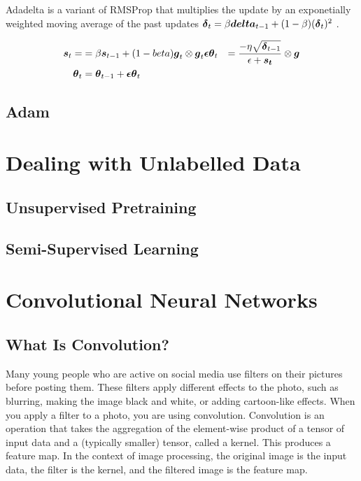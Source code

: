 \documentclass{article}
\begin{document}
Adadelta is a variant of RMSProp that multiplies the update by an exponetially weighted moving average of the past updates \(\vb*{\delta}_t = \beta \vb*{delta}_{t-1} + (1-\beta)(\vb*{\delta}_t)^2\) \cite{pml1book} \cite{zeiler2012}.

\begin{align*}
    \vb*{s}_t = &= \beta \vb*{s}_{t-1} + (1-beta)\vb*{g}_t \otimes \vb*{g}_t
    \vb*{\epsilon \theta}_t &= \frac{-\eta \sqrt{\vb*{\delta}_{t-1}}}{\epsilon + \vb*{s_t}} \otimes \vb*{g} \\
    \vb*{\theta}_t &= \vb*{\theta}_{t-1} + \vb*{\epsilon \theta}_t
\end{align*}


\subsection{Adam} %

\section{Dealing with Unlabelled Data}

\subsection{Unsupervised Pretraining}

\subsection{Semi-Supervised Learning} %

\section{Convolutional Neural Networks}


\subsection{What Is Convolution?}

Many young people who are active on social media use filters on their pictures before posting them. These filters apply different effects to the photo, such as blurring, making the image black and white, or adding cartoon-like effects. When you apply a filter to a photo, you are using convolution. Convolution is an operation that takes the aggregation of the element-wise product of a tensor of input data and a (typically smaller) tensor, called a kernel. This produces a feature map. In the context of image processing, the original image is the input data, the filter is the kernel, and the filtered image is the feature map. 
\end{document}
